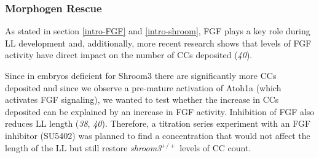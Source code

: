 \documentclass[10pt, b5paper, singlespacinge, twoside]{reedthesis} %
\theoremstyle{definition}
\theoremstyle{definition}
\theoremstyle{definition}
\theoremstyle{remark}
\begin{document}
\hypertarget{morphogen-rescue}{%
\subsubsection{Morphogen Rescue}\label{morphogen-rescue}}

As stated in section \ref{intro-FGF} and \ref{intro-shroom}, FGF plays a key role during LL development and, additionally, more recent research shows that levels of FGF activity have direct impact on the number of CCs deposited (\emph{40}).

Since in embryos deficient for Shroom3 there are significantly more CCs deposited and since we observe a pre-mature activation of Atoh1a (which activates FGF signaling), we wanted to test whether the increase in CCs deposited can be explained by an increase in FGF activity. Inhibition of FGF also reduces LL length (\emph{38}, \emph{40}). Therefore, a titration series experiment with an FGF inhibitor (SU5402) was planned to find a concentration that would not affect the length of the LL but still restore \emph{shroom3}\(^{+/+}\) levels of CC count.\newline
\end{document}
